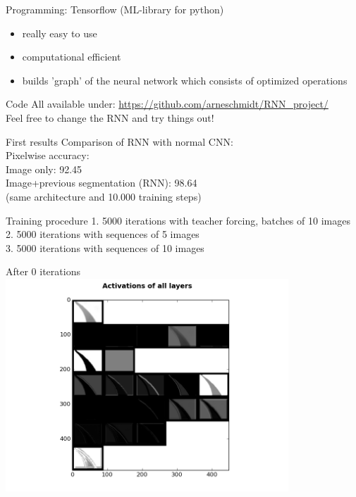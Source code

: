 \begin{frame}{Programming: Tensorflow (ML-library for python)}
\begin{itemize}
\item really easy to use
\item computational efficient
\item builds 'graph' of the neural network which consists of optimized operations
\end{itemize}
\end{frame}

\begin{frame}{Code}
All available under: \url{https://github.com/arneschmidt/RNN_project/}\\ 
Feel free to change the RNN and try things out!
\end{frame}

\begin{frame}{First results}
Comparison of RNN with normal CNN:\\
Pixelwise accuracy:\\
Image only: 92.45 \\
Image+previous segmentation (RNN): 98.64 \\
(same architecture and 10.000 training steps)
\end{frame}

\begin{frame}{Training procedure}
1. 5000 iterations with teacher forcing, batches of 10 images\\
2. 5000 iterations with sequences of 5 images\\
3. 5000 iterations with sequences of 10 images\\
\end{frame}

\begin{frame}{After 0 iterations}
\includegraphics[height=8.0cm]{data/activations/output-0.png}\\ 
\end{frame}

